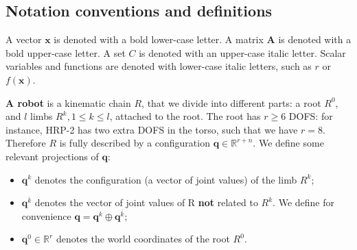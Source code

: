\subsection{Notation conventions and definitions} \label{notations}

A vector  $\mathbf{x}$ is denoted with a bold lower-case letter.
A matrix $\mathbf{A}$ is denoted with a bold upper-case letter.
A set $C$ is denoted with an upper-case italic letter.
Scalar variables and functions are denoted with lower-case italic letters, such as
$r$ or $f(\textbf{x})$.



\medskip
\textbf{A robot} is a kinematic chain $R$, that we divide into different parts: a root $R^0$, and $l$ limbs $R^k, 1 \leq k \leq l$, attached to the root.
The root has $r \geq 6$ DOFS: for instance, HRP-2 has two extra DOFS in the torso, such that we have $r=8$.
Therefore $R$ is fully described by a configuration $\mathbf{q} \in  \mathbb{R}^{r+n}$.
We define some relevant projections of $\mathbf{q}$:
\begin{itemize}
	\item $\mathbf{q}^k$ denotes the configuration (a vector of joint values) of the limb $R^k$; %
	\item $\mathbf{q}^{\overline{k}}$ denotes the vector of joint values of R \textbf{not} related to $R^k$. We define for convenience \mbox{$\mathbf{q}= \mathbf{q}^k \oplus \mathbf{q}^{\overline{k}}$}; %
	\item $\mathbf{q}^{0}\in \mathbb{R}^r$ denotes the world coordinates of the root $R^0$.
\end{itemize}

